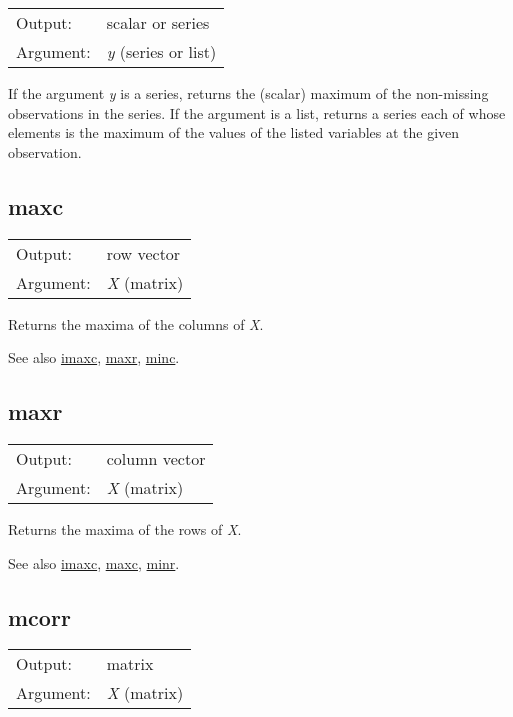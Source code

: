 \begin{tabular}{ll}
Output:     & scalar or series\\
Argument:   & \textsl{y} (series or list)\\
\end{tabular}

	  If the argument \textsl{y} is a series, returns the
	  (scalar) maximum of the non-missing observations in the series.
	  If the argument is a list, returns a series each of whose
	  elements is the maximum of the values of the listed variables at
	  the given observation.

\subsection{maxc}
\hypertarget{func-maxc}{}

\begin{tabular}{ll}
Output:     & row vector\\
Argument:   & \textsl{X} (matrix)\\
\end{tabular}

	  Returns the maxima of the columns of \textsl{X}.

	  See also \hyperlink{func-imaxc}{imaxc}, \hyperlink{func-maxr}{maxr}, \hyperlink{func-minc}{minc}.

\subsection{maxr}
\hypertarget{func-maxr}{}

\begin{tabular}{ll}
Output:     & column vector\\
Argument:   & \textsl{X} (matrix)\\
\end{tabular}

	  Returns the maxima of the rows of \textsl{X}. 

	  See also \hyperlink{func-imaxc}{imaxc}, \hyperlink{func-maxc}{maxc}, \hyperlink{func-minr}{minr}.

\subsection{mcorr}
\hypertarget{func-mcorr}{}

\begin{tabular}{ll}
Output:     & matrix\\
Argument:   & \textsl{X} (matrix)\\
\end{tabular}

